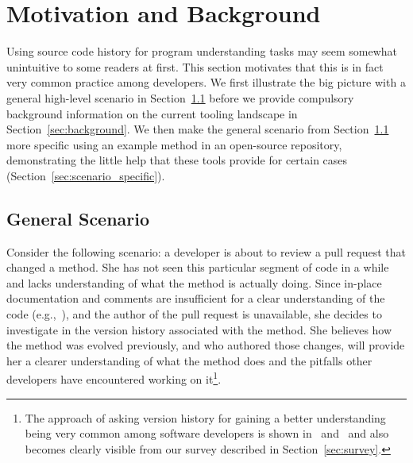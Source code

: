 
\section{Motivation and Background}
\label{sec:motivation}

Using source code history for program understanding tasks may seem somewhat unintuitive to some readers at first. This section motivates that this is in fact very common practice among developers. We first illustrate the big picture with a general high-level scenario in Section~\ref{sec:scenario_general} before we provide compulsory background information on the current tooling landscape in Section~\ref{sec:background}. We then make the general scenario from Section~\ref{sec:scenario_general} more specific using an example method in an open-source repository, demonstrating the little help that these tools provide for certain cases (Section~\ref{sec:scenario_specific}).


\subsection{General Scenario}
\label{sec:scenario_general}

Consider the following scenario: a developer is about to review a pull request that changed a method. 
She has not seen this particular segment of code in a while and lacks understanding of what the method is actually doing. 
Since in-place documentation and comments are insufficient for a clear understanding of the code (e.g.,~\cite{XXX,singer97}), and the author of the pull request is unavailable, she decides to investigate in the version history associated with the method. She believes how the method was evolved previously, and who authored those changes, will provide her a clearer understanding of what the method does and the pitfalls other developers have encountered working on it\footnote{The approach of asking version history for gaining a better understanding being very common among software developers is shown in~\cite{XXX} and~\cite{XXX} and also becomes clearly visible from our survey described in Section~\ref{sec:survey}.}.

